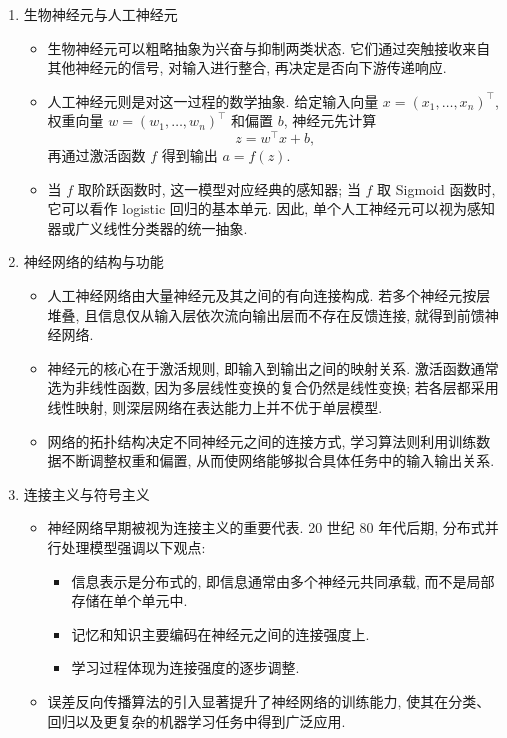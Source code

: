\documentclass{../nndlcourse}
\begin{document}
\begin{enumerate}
    \item 生物神经元与人工神经元
    \begin{itemize}
        \item 生物神经元可以粗略抽象为兴奋与抑制两类状态. 它们通过突触接收来自其他神经元的信号, 对输入进行整合, 再决定是否向下游传递响应. 
        \item 人工神经元则是对这一过程的数学抽象. 给定输入向量 $x = (x_1, \dots, x_n)^\top$, 权重向量 $w = (w_1, \dots, w_n)^\top$ 和偏置 $b$, 神经元先计算
        \begin{equation*}
            z = w^\top x + b,
        \end{equation*}
        再通过激活函数 $f$ 得到输出 $a = f(z)$. 
        \item 当 $f$ 取阶跃函数时, 这一模型对应经典的感知器; 当 $f$ 取 Sigmoid 函数时, 它可以看作 logistic 回归的基本单元. 因此, 单个人工神经元可以视为感知器或广义线性分类器的统一抽象. 
    \end{itemize}
    \item 神经网络的结构与功能
    \begin{itemize}
        \item 人工神经网络由大量神经元及其之间的有向连接构成. 若多个神经元按层堆叠, 且信息仅从输入层依次流向输出层而不存在反馈连接, 就得到前馈神经网络. 
        \item 神经元的核心在于激活规则, 即输入到输出之间的映射关系. 激活函数通常选为非线性函数, 因为多层线性变换的复合仍然是线性变换; 若各层都采用线性映射, 则深层网络在表达能力上并不优于单层模型. 
        \item 网络的拓扑结构决定不同神经元之间的连接方式, 学习算法则利用训练数据不断调整权重和偏置, 从而使网络能够拟合具体任务中的输入输出关系. 
    \end{itemize}
    \item 连接主义与符号主义
    \begin{itemize}
        \item 神经网络早期被视为连接主义的重要代表. 20 世纪 80 年代后期, 分布式并行处理模型强调以下观点:
        \begin{itemize}
            \item 信息表示是分布式的, 即信息通常由多个神经元共同承载, 而不是局部存储在单个单元中. 
            \item 记忆和知识主要编码在神经元之间的连接强度上. 
            \item 学习过程体现为连接强度的逐步调整. 
        \end{itemize}
        \item 误差反向传播算法的引入显著提升了神经网络的训练能力, 使其在分类、回归以及更复杂的机器学习任务中得到广泛应用. 

\end{itemize}
\end{enumerate}
\end{document}
